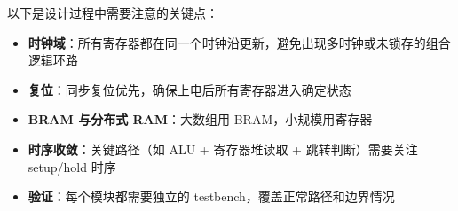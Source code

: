 
以下是设计过程中需要注意的关键点：

\begin{itemize}
    \item \textbf{时钟域}：所有寄存器都在同一个时钟沿更新，避免出现多时钟或未锁存的组合逻辑环路
    \item \textbf{复位}：同步复位优先，确保上电后所有寄存器进入确定状态
    \item \textbf{BRAM 与分布式 RAM}：大数组用 BRAM，小规模用寄存器
    \item \textbf{时序收敛}：关键路径（如 ALU + 寄存器堆读取 + 跳转判断）需要关注 setup/hold 时序
    \item \textbf{验证}：每个模块都需要独立的 testbench，覆盖正常路径和边界情况
\end{itemize}
